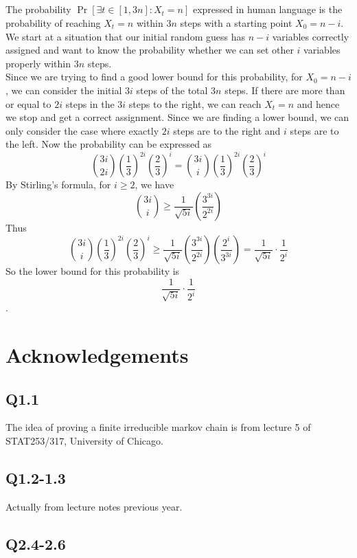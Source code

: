 \documentclass[12pt,letterpaper]{article}
\begin{document}
\subsection{}
The probability $\Pr\left[ \exists t\in[1,3n] :X_t=n\right]$
expressed in human language is the probability of reaching $X_t=n$ within $3n$ steps 
with a starting point $X_0=n-i$. We start at a situation that our initial random guess 
has $n-i$ variables correctly assigned and want to know the probability 
whether we can set other $i$ variables properly within $3n$ steps.\\
Since we are trying to find a good lower bound for this probability,
for $X_0=n-i$, we can consider the initial $3i$ steps of the total $3n$ steps.
If there are more than or equal to $2i$ steps in the $3i$ steps to the right, 
we can reach $X_t=n$ and hence we stop and get a correct assignment. 
Since we are finding a lower bound, 
we can only consider the case where exactly $2i$ steps are to the right
and $i$ steps are to the left.
Now the probability can be expressed as 
$$\binom{3i}{2i}\left(\frac{1}{3}\right)^{2i}\left(\frac{2}{3}\right)^i=\binom{3i}{i}\left(\frac{1}{3}\right)^{2i}\left(\frac{2}{3}\right)^i$$ 
By Stirling's formula, for $i\geq 2$, we have 
$$\binom{3i}{i}\geq \frac{1}{\sqrt{5i}}\left(\frac{3^{3i}}{2^{2i}}\right)$$
Thus $$\binom{3i}{i}\left(\frac{1}{3}\right)^{2i}\left(\frac{2}{3}\right)^i\geq 
\frac{1}{\sqrt{5i}}\left(\frac{3^{3i}}{2^{2i}}\right)\left(\frac{2^i}{3^{3i}}\right)
=\frac{1}{\sqrt{5i}}\cdot\frac{1}{2^i}$$
So the lower bound for this probability is 
$$\frac{1}{\sqrt{5i}}\cdot\frac{1}{2^i}$$.

\subsection{}

\subsection{}


\newpage
\section{Acknowledgements}
\subsection*{Q1.1}
The idea of proving a finite irreducible markov chain is from lecture 5 of STAT253/317, University of Chicago.
\subsection*{Q1.2-1.3}
Actually from lecture notes previous year.
\subsection*{Q2.4-2.6}
\end{document}
